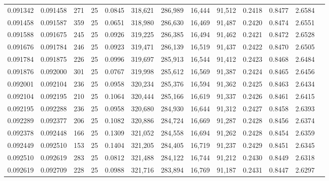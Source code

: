\begin{tabular}{rrrrrrrrrrrrr}
0.091342 & 0.091458 &   271 &  25 &                                     0.0845 & 318,621 & 286,989 &  16,444 &  91,512 & 0.2418 & 0.8477 & 2.6584 \\
0.091458 & 0.091587 &   359 &  25 &                                     0.0651 & 318,980 & 286,630 &  16,469 &  91,487 & 0.2420 & 0.8474 & 2.6551 \\
0.091588 & 0.091675 &   245 &  25 &                                     0.0926 & 319,225 & 286,385 &  16,494 &  91,462 & 0.2421 & 0.8472 & 2.6528 \\
0.091676 & 0.091784 &   246 &  25 &                                     0.0923 & 319,471 & 286,139 &  16,519 &  91,437 & 0.2422 & 0.8470 & 2.6505 \\
0.091784 & 0.091875 &   226 &  25 &                                     0.0996 & 319,697 & 285,913 &  16,544 &  91,412 & 0.2423 & 0.8468 & 2.6484 \\
0.091876 & 0.092000 &   301 &  25 &                                     0.0767 & 319,998 & 285,612 &  16,569 &  91,387 & 0.2424 & 0.8465 & 2.6456 \\
0.092001 & 0.092104 &   236 &  25 &                                     0.0958 & 320,234 & 285,376 &  16,594 &  91,362 & 0.2425 & 0.8463 & 2.6434 \\
0.092104 & 0.092195 &   210 &  25 &                                     0.1064 & 320,444 & 285,166 &  16,619 &  91,337 & 0.2426 & 0.8461 & 2.6415 \\
0.092195 & 0.092288 &   236 &  25 &                                     0.0958 & 320,680 & 284,930 &  16,644 &  91,312 & 0.2427 & 0.8458 & 2.6393 \\
0.092289 & 0.092377 &   206 &  25 &                                     0.1082 & 320,886 & 284,724 &  16,669 &  91,287 & 0.2428 & 0.8456 & 2.6374 \\
0.092378 & 0.092448 &   166 &  25 &                                     0.1309 & 321,052 & 284,558 &  16,694 &  91,262 & 0.2428 & 0.8454 & 2.6359 \\
0.092449 & 0.092510 &   153 &  25 &                                     0.1404 & 321,205 & 284,405 &  16,719 &  91,237 & 0.2429 & 0.8451 & 2.6345 \\
0.092510 & 0.092619 &   283 &  25 &                                     0.0812 & 321,488 & 284,122 &  16,744 &  91,212 & 0.2430 & 0.8449 & 2.6318 \\
0.092619 & 0.092709 &   228 &  25 &                                     0.0988 & 321,716 & 283,894 &  16,769 &  91,187 & 0.2431 & 0.8447 & 2.6297 \\

\end{tabular}

